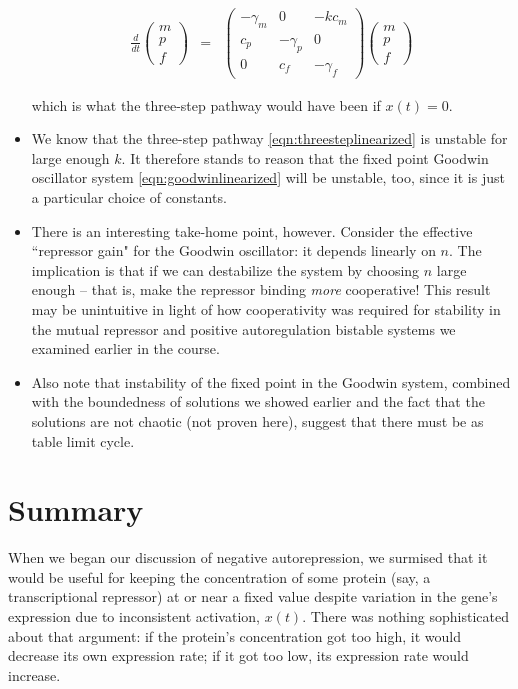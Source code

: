 \documentclass{article}
\begin{document}
\begin{itemize}
\begin{eqnarray}
\frac{d}{dt} \begin{pmatrix} m \\ p \\ f \end{pmatrix} & = & \begin{pmatrix} -\gamma_m & 0 & - k c_m \\ c_p & -\gamma_p& 0\\ 0 & c_f & -\gamma_f \end{pmatrix} \begin{pmatrix} m \\ p\\ f \end{pmatrix} \label{eqn:threesteplinearized}
\end{eqnarray}

which is what the three-step pathway would have been if $x(t)=0$.

\item We know that the three-step pathway \ref{eqn:threesteplinearized} is unstable for large enough $k$. It therefore stands to reason that the fixed point Goodwin oscillator system \ref{eqn:goodwinlinearized} will be unstable, too, since it is just a particular choice of constants.

\item There is an interesting take-home point, however. Consider the effective ``repressor gain" for the Goodwin oscillator: it depends linearly on $n$. The implication is that if we can destabilize the system by choosing $n$ large enough -- that is, make the repressor binding \textit{more} cooperative! This result may be unintuitive in light of how cooperativity was required for stability in the mutual repressor and positive autoregulation bistable systems we examined earlier in the course.

\item Also note that instability of the fixed point in the Goodwin system, combined with the boundedness of solutions we showed earlier and the fact that the solutions are not chaotic (not proven here), suggest that there must be as table limit cycle.

\end{itemize}

\section*{Summary}

When we began our discussion of negative autorepression, we surmised that it would be useful for keeping the concentration of some protein (say, a transcriptional repressor) at or near a fixed value despite variation in the gene's expression due to inconsistent activation, $x(t)$. There was nothing sophisticated about that argument: if the protein's concentration got too high, it would decrease its own expression rate; if it got too low, its expression rate would increase.\\
\end{document}
